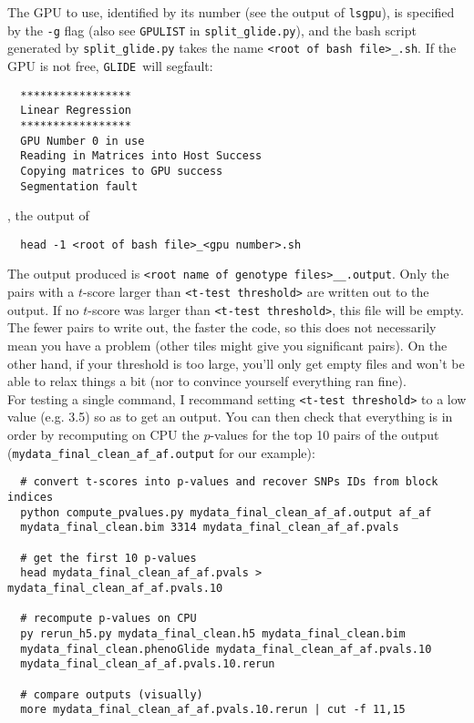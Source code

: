 \documentclass{article}
\newcommand{\red}[1]{{\color{MyOrange}{\textbf{#1}}}}
\newcommand{\glide}{\texttt{GLIDE}}
\begin{document}
The GPU to use, identified by its number (see the output of \texttt{lsgpu}), is specified by the \texttt{-g} flag (also see \texttt{GPULIST} in \texttt{split\_glide.py}), and the bash script generated by \texttt{split\_glide.py} takes the name \texttt{<root of bash file>\_<gpu number>.sh}. If the GPU is not free, \glide\ will segfault:\\

\begin{verbatim}
  *****************
  Linear Regression
  ***************** 
  GPU Number 0 in use 
  Reading in Matrices into Host Success 
  Copying matrices to GPU success 
  Segmentation fault
\end{verbatim}

\red{Always start by testing a single command}, the output of \\

\begin{verbatim}
  head -1 <root of bash file>_<gpu number>.sh
\end{verbatim}

The output produced is \texttt{<root name of genotype
  files>\_<tile1>\_<tile2>.output}. Only the pairs with a $t$-score
larger than \texttt{<t-test threshold>} are written out to the
output. If no $t$-score was larger than \texttt{<t-test threshold>},
this file will be empty. The fewer pairs to write out, the faster the
code, so this does not necessarily mean you have a problem (other
tiles might give you significant pairs). On the other hand, if your
threshold is too large, you'll only get empty files and won't be able
to relax things a bit (nor to convince yourself everything ran
fine).\\

For testing a single command, I recommand setting \texttt{<t-test threshold>} to a low value (e.g. 3.5) so as to get an output. You can then check that
everything is in order by recomputing on CPU the $p$-values for the top 10
pairs of the output (\texttt{mydata\_final\_clean\_af\_af.output} for our example):\\

\begin{verbatim}
  # convert t-scores into p-values and recover SNPs IDs from block indices    
  python compute_pvalues.py mydata_final_clean_af_af.output af_af
  mydata_final_clean.bim 3314 mydata_final_clean_af_af.pvals

  # get the first 10 p-values
  head mydata_final_clean_af_af.pvals > mydata_final_clean_af_af.pvals.10

  # recompute p-values on CPU
  py rerun_h5.py mydata_final_clean.h5 mydata_final_clean.bim 
  mydata_final_clean.phenoGlide mydata_final_clean_af_af.pvals.10
  mydata_final_clean_af_af.pvals.10.rerun

  # compare outputs (visually)
  more mydata_final_clean_af_af.pvals.10.rerun | cut -f 11,15
\end{verbatim}
\end{document}

